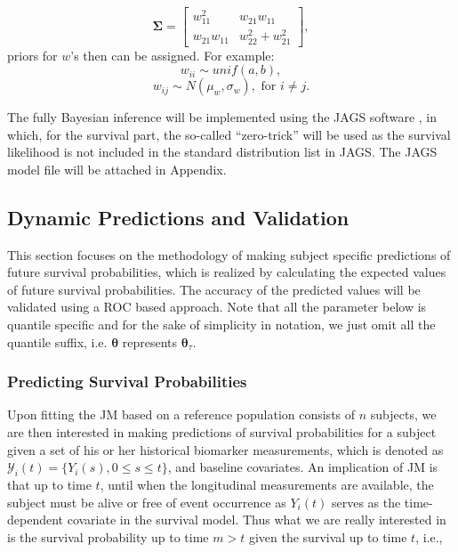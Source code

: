 \begin{equation}\label{eqn:cholesky}
\boldsymbol{\Sigma}=
\begin{bmatrix}
w_{11}^2 & w_{21}w_{11}\\
w_{21}w_{11} & w_{22}^2 + w_{21}^2 
\end{bmatrix},
\end{equation}
priors for $w$'s then can be assigned. For example:
\[w_{ii}\sim unif(a, b),\]
\[w_{ij}\sim N(\mu_w, \sigma_w), \mbox{ for } i\ne j.\]

The fully Bayesian inference will be implemented using the JAGS software \citep{plummer2003jags}, in which, for the survival part, the so-called ``zero-trick'' will be used as the survival likelihood is not included in the standard distribution list in JAGS.  The JAGS model file will be attached in Appendix.


\subsection{Dynamic Predictions and Validation}\label{sec:dpred}
This section focuses on the methodology of making subject specific predictions of future survival probabilities, which is realized by calculating the expected values of future survival probabilities. The accuracy of the predicted values will be validated using a ROC based approach. Note that all the parameter below is quantile specific and for the sake of simplicity in notation, we just omit all the quantile suffix, i.e. $\boldsymbol{\theta}$ represents $\boldsymbol{\theta}_{\tau}$.



\subsubsection{Predicting Survival Probabilities}
 Upon fitting the JM based on a reference population consists of $n$ subjects, we are then interested in making predictions of survival probabilities for a subject given a set of his or her historical biomarker measurements, which is denoted as $\mathcal{Y}_i(t)=\{Y_i(s), 0\le s\le t\}$, and baseline covariates. An implication of JM is that up to time $t$, until when the longitudinal measurements are available, the subject must be alive or free of event occurrence as $Y_i(t)$ serves as the time-dependent covariate in the survival model. Thus what we are really interested in is the survival probability up to time $m>t$ given the survival up to time $t$, i.e.,

